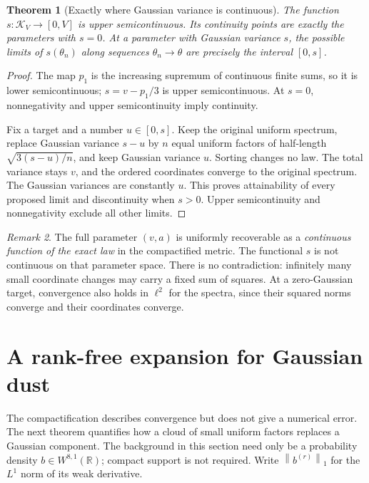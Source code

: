 \documentclass[11pt,letterpaper]{article}
\numberwithin{equation}{section}
\newtheorem{theorem}{Theorem}[section]
\theoremstyle{definition}
\theoremstyle{remark}
\newtheorem{remark}[theorem]{Remark}
\newcommand{\R}{\mathbb R}
\newcommand{\norm}[1]{\left\lVert#1\right\rVert}
\newcommand{\K}{\mathcal K_V}
\begin{document}
\begin{theorem}[Exactly where Gaussian variance is continuous]
\label{thm:continuity}
The function $s:\K\to[0,V]$ is upper semicontinuous. Its continuity points
are exactly the parameters with $s=0$. At a parameter with Gaussian variance
$s$, the possible limits of $s(\theta_n)$ along sequences
$\theta_n\to\theta$ are precisely the interval $[0,s]$.
\end{theorem}
\begin{proof}
The map $p_1$ is the increasing supremum of continuous finite sums, so it is
lower semicontinuous; $s=v-p_1/3$ is upper semicontinuous. At $s=0$,
nonnegativity and upper semicontinuity imply continuity.

Fix a target and a number $u\in[0,s]$. Keep the original uniform spectrum,
replace Gaussian variance $s-u$ by $n$ equal uniform factors of half-length
$\sqrt{3(s-u)/n}$, and keep Gaussian variance $u$. Sorting changes no law.
The total variance stays $v$, and the ordered coordinates converge to the
original spectrum. The Gaussian variances are constantly $u$. This proves
attainability of every proposed limit and discontinuity when $s>0$.
Upper semicontinuity and nonnegativity exclude all other limits.
\end{proof}

\begin{remark}
The full parameter $(v,a)$ is uniformly recoverable as a \emph{continuous
function of the exact law} in the compactified metric. The functional $s$ is
not continuous on that parameter space. There is no contradiction: infinitely
many small coordinate changes may carry a fixed sum of squares.
At a zero-Gaussian target, convergence also holds in $\ell^2$ for the spectra,
since their squared norms converge and their coordinates converge.
\end{remark}

\section{A rank-free expansion for Gaussian dust}
\label{sec:dust}

The compactification describes convergence but does not give a numerical error.
The next theorem quantifies how a cloud of small uniform factors replaces a
Gaussian component. The background in this section need only be a probability
density $b\in W^{8,1}(\R)$; compact support is not required. Write
$\norm{b^{(r)}}_1$ for the $L^1$ norm of its weak derivative.
\end{document}
